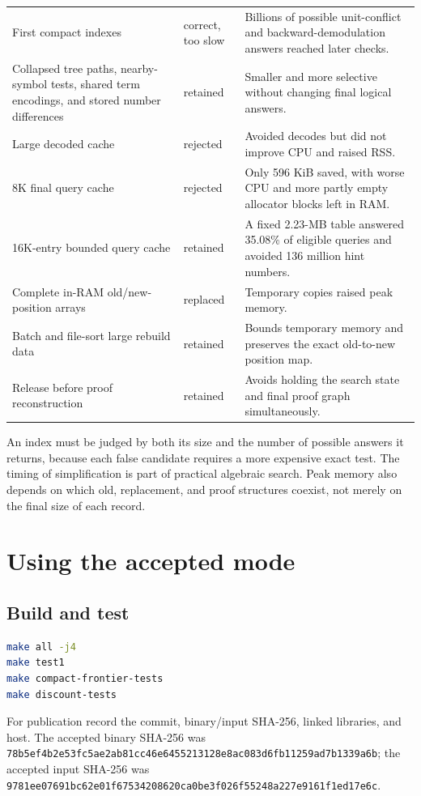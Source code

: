 \documentclass[11pt]{article}
\newcommand{\hashval}[1]{\nolinkurl{#1}}
\begin{document}
\begin{longtable}{>{\raggedright\arraybackslash}p{}
                  >{\raggedright\arraybackslash}p{}
                  >{\raggedright\arraybackslash}p{}}
First compact indexes & correct, too slow & Billions of possible unit-conflict
and backward-demodulation answers reached later checks. \\
Collapsed tree paths, nearby-symbol tests, shared term encodings, and stored
number differences & retained & Smaller and more selective without changing
final logical answers. \\
Large decoded cache & rejected & Avoided decodes but did not improve CPU and
raised RSS. \\
8K final query cache & rejected & Only 596 KiB saved, with worse CPU and more
partly empty allocator blocks left in RAM. \\
16K-entry bounded query cache & retained & A fixed 2.23-MB table answered
35.08\% of eligible queries and avoided 136 million hint numbers. \\
Complete in-RAM old/new-position arrays & replaced & Temporary copies raised
peak memory. \\
Batch and file-sort large rebuild data & retained & Bounds temporary memory and
preserves the exact old-to-new position map. \\
Release before proof reconstruction & retained & Avoids holding the search state
and final proof graph simultaneously. \\
\bottomrule
\end{longtable}

An index must be judged by both its size and the number of possible answers it
returns, because each false candidate requires a more expensive exact test.
The timing of simplification is part of practical algebraic search.  Peak
memory also depends on which old, replacement, and proof structures coexist,
not merely on the final size of each record.

\section{Using the accepted mode}

\subsection{Build and test}

\begin{lstlisting}[language=bash]
make all -j4
make test1
make compact-frontier-tests
make discount-tests
\end{lstlisting}

For publication record the commit, binary/input SHA-256, linked libraries, and
host.  The accepted binary SHA-256 was
\hashval{78b5ef4b2e53fc5ae2ab81cc46e6455213128e8ac083d6fb11259ad7b1339a6b};
the accepted input SHA-256 was
\hashval{9781ee07691bc62e01f67534208620ca0be3f026f55248a227e9161f1ed17e6c}.
\end{document}
